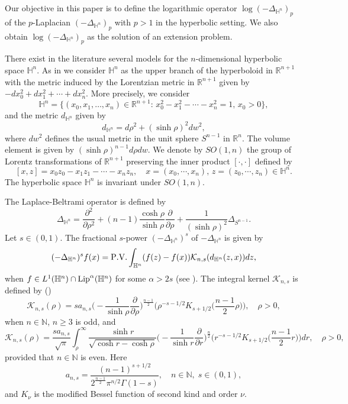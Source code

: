 \documentclass[a4paper,10pt, reqno]{amsart}
\theoremstyle{definition}
\theoremstyle{remark}
\numberwithin{equation}{section}
\begin{document}
Our objective in this paper is to define the logarithmic operator $\log (-\Delta_{\mathbb H^n})_p$ of the $p$-Laplacian $(-\Delta_{\mathbb H^n})_p$ with $p>1$ in the hyperbolic setting. We also obtain $\log(-\Delta_{\mathbb H^n})_p$ as the solution of an extension problem. 

There exist in the literature several models for the $n$-dimensional hyperbolic space $\mathbb H^n$. As in \cite{BGS} we consider $\mathbb H^n$ as the upper branch of the hyperboloid in $\mathbb R^{n+1}$ with the metric induced by the Lorentzian metric in $\mathbb R^{n+1}$ given by $-dx_0^2+dx_1^2+\cdots+dx_n^2$. More precisely, we consider
$$
\mathbb H^n=\big\{(x_0,x_1,\ldots, x_n)\in \mathbb R^{n+1}:\,x_0^2-x_1^2-\cdots -x_n^2=1,\,x_0>0\big\},
$$
and the metric $d_{\mathbb H^n}$ given by
$$
d_{\mathbb H^n}=d\rho ^2+(\sinh \rho )^2dw^2,
$$
where $dw^2$ defines the usual metric in the unit sphere $S^{n-1}$ in $\mathbb R^n$. The volume element is given by $(\sinh \rho )^{n-1}d\rho dw$. We denote  by $SO(1,n)$ the group of Lorentz transformations of $\mathbb R^{n+1}$ preserving the inner product $[\cdot,\cdot]$ defined by
$$
[x,z]=x_0z_0-x_1z_1-\cdots -x_nz_n,\quad x=(x_0,\cdots, x_n),\,z=(z_0,\cdots, z_n)\in \mathbb H^n.
$$
The hyperbolic space $\mathbb H^n$ is invariant under $SO(1,n)$.

The Laplace-Beltrami operator is defined by
$$
\Delta_{\mathbb H^n}=\frac{\partial ^2}{\partial \rho ^2}+(n-1)\frac{\cosh \rho }{\sinh \rho }\frac{\partial }{\partial \rho} +\frac{1}{(\sinh \rho )^2}\Delta_{S^{n-1}}.
$$
Let $s\in (0,1)$. The fractional $s$-power $(-\Delta_{\mathbb H^n})^s$ of $-\Delta_{\mathbb H^n}$ is given by
$$
(-\Delta_{\mathbb H^n})^sf(x)={\rm P.V.} \int_{\mathbb H^n}(f(z)-f(x))\mathcal K_{n,s}(d_{\mathbb H^n}(z,x))dz,
$$
when $f\in L^1(\mathbb H^n)\cap {\rm Lip}^\alpha (\mathbb H^n)$ for some $\alpha >2s$ (see \cite[Theorem 2.5]{BGS}). The integral kernel $\mathcal K_{n,s}$ is defined by (\cite[Definition 1.1]{KKL})
$$
\mathcal K_{n,s}(\rho )=sa_{n,s}\Big(-\frac{1}{\sinh \rho }\frac{\partial}{\partial \rho} \Big)^{\frac{n-1}{2}}\Big(\rho ^{-s-1/2}K_{s+1/2}\big(\frac{n-1}{2}\rho \big)\Big),\quad \rho >0,
$$
when $n\in \mathbb N$, $n\geq 3$ is odd, and
$$
\mathcal K_{n,s}(\rho )=\frac{sa_{n,s}}{\sqrt{\pi}}\int_\rho ^\infty \frac{\sinh r}{\sqrt{\cosh r-\cosh \rho }}\Big(-\frac{1}{\sinh r }\frac{\partial }{\partial r}\Big)^{\frac{n}{2}}\Big(r^{-s-1/2}K_{s+1/2}\big(\frac{n-1}{2}r\big)\Big)dr,\quad \rho >0,
$$
provided that $n\in \mathbb N$ is even. Here 
$$
a_{n,s}=\frac{(n-1)^{s+1/2}}{2^{\frac{n-1}{2}}\pi^{n/2}\Gamma (1-s)},\quad n\in \mathbb N,\;s\in (0,1),
$$
and $K_\nu$ is the modified Bessel function of second kind and order $\nu$.
\end{document}
